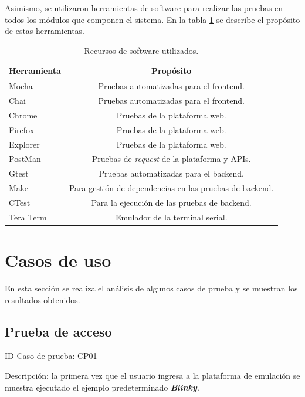 Asimismo, se utilizaron herramientas de software para realizar las pruebas
en todos los módulos que componen el sistema. En la tabla \ref{tab:RecursosSoftware} se describe el propósito de estas herramientas.

\begin{table}[h]
	\centering
	\caption[Recursos de software utilizados]{Recursos de software utilizados.}
	\begin{tabular}{l c}    
		\toprule
		\textbf{Herramienta} & \textbf{Propósito}\\
		\midrule
		Mocha &  Pruebas automatizadas para el frontend.\\		
		Chai &   Pruebas automatizadas para el frontend.\\
		Chrome & Pruebas de la plataforma web.\\
		Firefox & Pruebas de la plataforma web.\\
		Explorer &  Pruebas de la plataforma web. \\
		PostMan \citep{Postman} &  Pruebas de \textit{request} de la plataforma y APIs. \\
		Gtest &  Pruebas automatizadas para el backend. \\
		Make \citep{Make} &  Para gestión de dependencias en las pruebas de backend. \\
				CTest \citep{CTest} &  Para la ejecución de las pruebas de backend. \\
Tera Term \citep{TeraTerm}		&  Emulador de la terminal serial. \\
		\bottomrule
		\hline
	\end{tabular}
	\label{tab:RecursosSoftware}
\end{table}



\section{Casos de uso}    
\label{sec:CasoUso}     

En esta sección se realiza el análisis de algunos casos de prueba y se muestran los resultados obtenidos. 

\subsection{Prueba de acceso}    

ID Caso de prueba: CP01 

Descripción: la primera vez que el usuario ingresa a la plataforma de emulación se muestra ejecutado el ejemplo predeterminado \textit{\textbf{Blinky}}.

